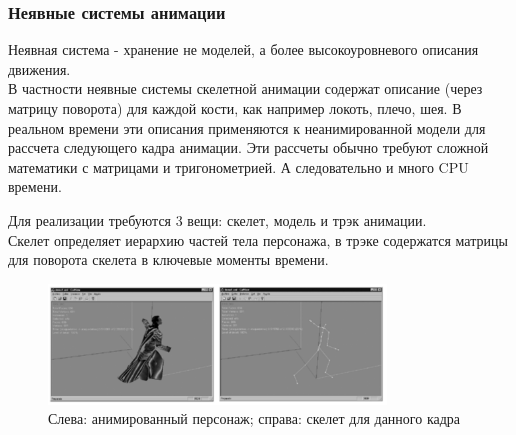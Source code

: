 \documentclass{beamer}
\begin{document}
  
\begin{frame}
\frametitle{Неявные системы анимации}
\begin{scriptsize}
    Неявная система - хранение не моделей, а более высокоуровневого описания движения. \\
    В частности неявные \alert{системы скелетной анимации} содержат описание (через матрицу поворота) для каждой кости, как например локоть, плечо, шея. В реальном времени эти описания применяются к неанимированной модели для рассчета следующего кадра анимации. Эти рассчеты обычно требуют сложной математики с матрицами и тригонометрией. А следовательно и много CPU времени.
    
    \medskip
    Для реализации требуются 3 вещи: скелет, модель и трэк анимации. \\  
    Скелет определяет иерархию частей тела персонажа, в трэке содержатся матрицы для поворота скелета в ключевые моменты времени.
    
\begin{figure}[h!]
    \centering
    \includegraphics[width=0.8\textwidth]{implicit_animation.png}
    \caption{\scriptsize{Слева: анимированный персонаж; справа: скелет для данного кадра}}
\end{figure}

\end{scriptsize}
\end{frame}
\end{document}

